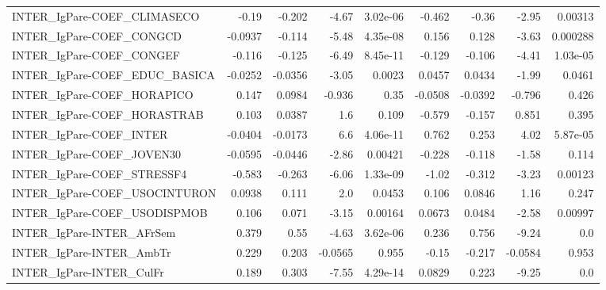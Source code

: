 \begin{tabular}{lrrrrrrrr}
INTER\_IgPare-COEF\_CLIMASECO           &       -0.19 &       -0.202 &    -4.67 & 3.02e-06 &     -0.462 &       -0.36 &        -2.95 &       0.00313 \\
INTER\_IgPare-COEF\_CONGCD              &     -0.0937 &       -0.114 &    -5.48 & 4.35e-08 &      0.156 &       0.128 &        -3.63 &      0.000288 \\
INTER\_IgPare-COEF\_CONGEF              &      -0.116 &       -0.125 &    -6.49 & 8.45e-11 &     -0.129 &      -0.106 &        -4.41 &      1.03e-05 \\
INTER\_IgPare-COEF\_EDUC\_BASICA         &     -0.0252 &      -0.0356 &    -3.05 &   0.0023 &     0.0457 &      0.0434 &        -1.99 &        0.0461 \\
INTER\_IgPare-COEF\_HORAPICO            &       0.147 &       0.0984 &   -0.936 &     0.35 &    -0.0508 &     -0.0392 &       -0.796 &         0.426 \\
INTER\_IgPare-COEF\_HORASTRAB           &       0.103 &       0.0387 &      1.6 &    0.109 &     -0.579 &      -0.157 &        0.851 &         0.395 \\
INTER\_IgPare-COEF\_INTER               &     -0.0404 &      -0.0173 &      6.6 & 4.06e-11 &      0.762 &       0.253 &         4.02 &      5.87e-05 \\
INTER\_IgPare-COEF\_JOVEN30             &     -0.0595 &      -0.0446 &    -2.86 &  0.00421 &     -0.228 &      -0.118 &        -1.58 &         0.114 \\
INTER\_IgPare-COEF\_STRESSF4            &      -0.583 &       -0.263 &    -6.06 & 1.33e-09 &      -1.02 &      -0.312 &        -3.23 &       0.00123 \\
INTER\_IgPare-COEF\_USOCINTURON         &      0.0938 &        0.111 &      2.0 &   0.0453 &      0.106 &      0.0846 &         1.16 &         0.247 \\
INTER\_IgPare-COEF\_USODISPMOB          &       0.106 &        0.071 &    -3.15 &  0.00164 &     0.0673 &      0.0484 &        -2.58 &       0.00997 \\
INTER\_IgPare-INTER\_AFrSem             &       0.379 &         0.55 &    -4.63 & 3.62e-06 &      0.236 &       0.756 &        -9.24 &           0.0 \\
INTER\_IgPare-INTER\_AmbTr              &       0.229 &        0.203 &  -0.0565 &    0.955 &      -0.15 &      -0.217 &      -0.0584 &         0.953 \\
INTER\_IgPare-INTER\_CulFr              &       0.189 &        0.303 &    -7.55 & 4.29e-14 &     0.0829 &       0.223 &        -9.25 &           0.0 \\

\end{tabular}
